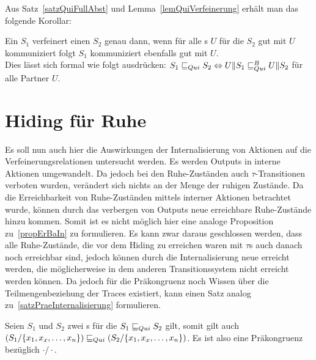 Aus Satz~\ref{satzQuiFullAbst} und Lemma~\ref{lemQuiVerfeinerung} erhält man
das folgende Korollar:

\begin{kor}
  Ein \EIO{} $S_1$ verfeinert einen \EIO{} $S_2$ genau dann, wenn für alle
  \EIO{}s $U$ für die $S_2$ gut mit $U$ kommuniziert folgt $S_1$ kommuniziert
  ebenfalls gut mit $U$.\\
  Dies lässt sich formal wie folgt ausdrücken: $S_1\sqsubseteq _{Qui} S_2\Leftrightarrow
  U\|S_1\sqsubseteq _{Qui}^B U\|S_2$ für alle Partner $U$.
\end{kor}

\section{Hiding für Ruhe}

Es soll nun auch hier die Auswirkungen der Internalisierung von Aktionen auf
die Verfeinerungsrelationen untersucht werden. Es werden Outputs in interne
Aktionen umgewandelt. Da jedoch bei den Ruhe-Zuständen auch
$\tau$-Transitionen verboten wurden, verändert sich nichts an der Menge der ruhigen
Zustände. Da die Erreichbarkeit von Ruhe-Zuständen mittels interner Aktionen
betrachtet wurde, können durch das verbergen von Outputs neue erreichbare
Ruhe-Zustände hinzu kommen. Somit ist es nicht möglich hier eine analoge
Proposition zu~\ref{propErBaIn} zu formulieren. Es kann zwar daraus
geschlossen werden, dass alle Ruhe-Zustände, die vor dem Hiding zu erreichen waren mit
$\tau$s auch danach noch erreichbar sind, jedoch können durch die
Internalisierung neue erreicht werden, die möglicherweise in dem anderen
Transitionssystem nicht erreicht werden können. Da jedoch für die
Präkongruenz \QRel{} noch Wissen über die Teilmengenbeziehung der Traces
existiert, kann einen Satz analog zu~\ref{satzPraeInternalisierung} formulieren.

\begin{satz}
  \label{satzPraeInterQui}
  Seien $S_1$ und $S_2$ zwei \EIO{}s für die $S_1\sqsubseteq _{Qui} S_2$ gilt, somit gilt
  auch $(S_1/\{x_1,x_x,\dots ,x_n\})\sqsubseteq _{Qui} (S_2/\{x_1,x_x,\dots ,x_n\})$. Es
  ist also \QRel{} eine Präkongruenz bezüglich $\cdot /\cdot$.
\end{satz}

